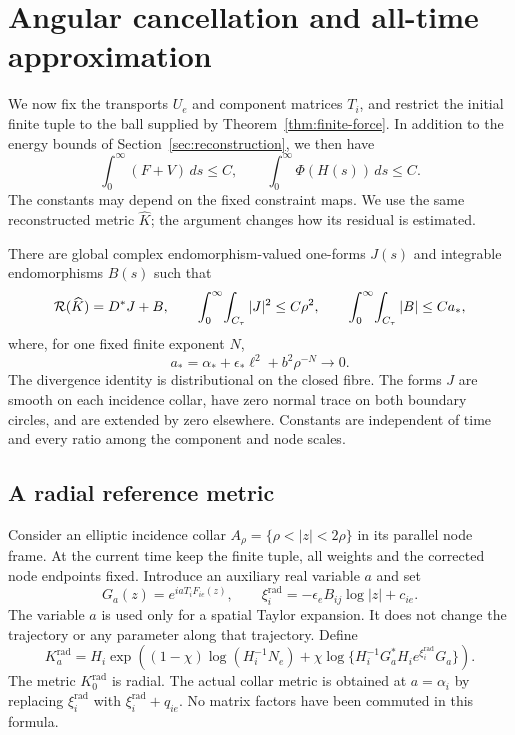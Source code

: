 \section{Angular cancellation and all-time approximation}\label{sec:angular}

We now fix the transports $U_e$ and component matrices $T_i$, and
restrict the initial finite tuple to the ball supplied by
Theorem~\ref{thm:finite-force}. In addition to the energy bounds of
Section~\ref{sec:reconstruction}, we then have
\begin{equation}\label{eq:integrable-forces}
 \int_0^\infty(F+V)\,ds\le C,\qquad
 \int_0^\infty\Phi(H(s))\,ds\le C.
\end{equation}
The constants may depend on the fixed constraint maps. We use the
same reconstructed metric $\widehat K$; the argument changes how
its residual is estimated.

\begin{proposition}\label{prop:global-weak-residual}
There are global complex endomorphism-valued one-forms $J(s)$
and integrable endomorphisms $B(s)$ such that
\begin{equation}\label{eq:global-weak-residual}
 \mathcal R(\widehat K)=D^*J+B,\qquad
 \int_0^\infty\!\int_{C_\tau}|J|^2\le C\rho^2,\qquad
 \int_0^\infty\!\int_{C_\tau}|B|\le C a_*,
\end{equation}
where, for one fixed finite exponent $N$,
\begin{equation}\label{eq:all-time-error}
 a_*=\alpha_*+\epsilon_*\ell^2+b^2\rho^{-N}\longrightarrow0.
\end{equation}
The divergence identity is distributional on the closed fibre.
The forms $J$ are smooth on each incidence collar, have zero normal
trace on both boundary circles, and are extended by zero elsewhere.
Constants are independent of time and every ratio among the
component and node scales.
\end{proposition}

\subsection{A radial reference metric}
Consider an elliptic incidence collar
$A_\rho=\{\rho<|z|<2\rho\}$ in its parallel node frame. At the
current time keep the finite tuple, all weights and the corrected
node endpoints fixed. Introduce an auxiliary real variable $a$
and set
\[
 G_a(z)=e^{iaT_iF_{ie}(z)},\qquad
 \xi_i^{\mathrm{rad}}=-\epsilon_e B_{ij}\log|z|+c_{ie}.
\]
The variable $a$ is used only for a spatial Taylor expansion. It
does not change the trajectory or any parameter along that
trajectory. Define
\begin{equation}\label{eq:radial-family}
 K_a^{\mathrm{rad}}
 =H_i\exp\left((1-\chi)\log(H_i^{-1}N_e)
 +\chi\log\{H_i^{-1}G_a^*H_i e^{\xi_i^{\mathrm{rad}}}G_a\}\right).
\end{equation}
The metric $K_0^{\mathrm{rad}}$ is radial. The actual collar
metric is obtained at $a=\alpha_i$ by replacing
$\xi_i^{\mathrm{rad}}$ with $\xi_i^{\mathrm{rad}}+q_{ie}$.
No matrix factors have been commuted in this formula.

